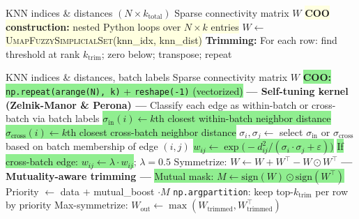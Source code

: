 \documentclass[8pt]{article}
\begin{document}
\begin{tcolorbox}[
    title={\textbf{Algorithm 2a:} Original BBKNN --- UMAP Fuzzy Set + Threshold Trim},
    colback=white, colframe=black!60, fonttitle=\small\bfseries,
    boxrule=0.5pt, arc=2pt, left=4pt, right=4pt, top=2pt, bottom=2pt
]
\begin{algorithmic}[1]
\small
\Require KNN indices \& distances $(N \times k_\text{total})$
\Ensure Sparse connectivity matrix $W$
\State \colorbox{lightyellow}{\textbf{COO construction:} nested Python loops over $N \times k$ entries} \Comment{\textcolor{removed}{$O(Nk)$ Python iterations}}
\State $W \gets$ \colorbox{lightyellow}{\textsc{UmapFuzzySimplicialSet}(knn\_idx, knn\_dist)} \Comment{\textcolor{removed}{Batch-agnostic weighting}}
\State \textbf{Trimming:} For each row: find threshold at rank $k_\text{trim}$; zero below; transpose; repeat
\end{algorithmic}
\end{tcolorbox}

\newpage

\begin{tcolorbox}[
    title={\textbf{Algorithm 2b:} bbknn\_optimized --- Self-tuning Kernel + Mutuality-aware Trim},
    colback=lightgreen!20, colframe=added!80, fonttitle=\small\bfseries,
    boxrule=0.5pt, arc=2pt, left=4pt, right=4pt, top=2pt, bottom=2pt
]
\begin{algorithmic}[1]
\small
\Require KNN indices \& distances, batch labels
\Ensure Sparse connectivity matrix $W$
\State \colorbox{lightgreen}{\textbf{COO:} \texttt{np.repeat(arange(N), k)} + \texttt{reshape(-1)} (vectorized)} \Comment{\textcolor{added}{No Python loops}}
\State \textbf{--- Self-tuning kernel (Zelnik-Manor \& Perona) ---}
\State Classify each edge as within-batch or cross-batch via batch labels
    \State \colorbox{lightgreen}{$\sigma_\text{in}(i) \gets k$th closest within-batch neighbor distance}
    \State \colorbox{lightgreen}{$\sigma_\text{cross}(i) \gets k$th closest cross-batch neighbor distance}
\EndFor
\State $\sigma_i, \sigma_j \gets$ select $\sigma_\text{in}$ or $\sigma_\text{cross}$ based on batch membership of edge $(i,j)$
\State \colorbox{lightgreen}{$w_{ij} \gets \exp\!\big(-d_{ij}^2 / (\sigma_i \cdot \sigma_j + \varepsilon)\big)$} \Comment{\textcolor{added}{Self-tuning Gaussian kernel}}
\State \colorbox{lightgreen}{If cross-batch edge: $w_{ij} \gets \lambda \cdot w_{ij}$}; \quad $\lambda = 0.5$ \Comment{\textcolor{added}{Cross-batch damping}}
\State Symmetrize: $W \gets W + W^\top - W \odot W^\top$ 
\State \textbf{--- Mutuality-aware trimming ---}
\State \colorbox{lightgreen}{Mutual mask: $M \gets \text{sign}(W) \odot \text{sign}(W^\top)$} \Comment{\textcolor{added}{Detect bidirectional edges}}
\State Priority $\gets$ data $+$ mutual\_boost $\cdot M$ 
\State \texttt{np.argpartition}: keep top-$k_\text{trim}$ per row by priority
\State Max-symmetrize: $W_\text{out} \gets \max(W_\text{trimmed}, W_\text{trimmed}^\top)$
\end{algorithmic}
\end{tcolorbox}
\end{document}
